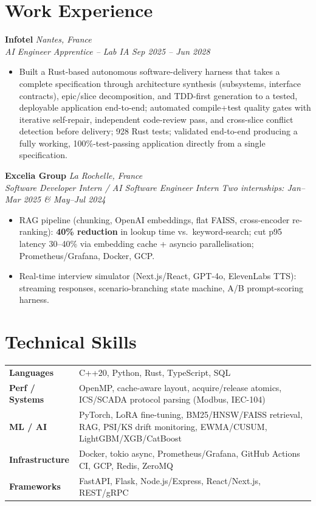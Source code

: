 \documentclass[10pt]{article}
\newcommand{\entry}[4]{%
  \noindent\textbf{#1} \hfill \textit{#2} \\
  \textit{#3} \hfill \textit{#4}\\[-0.22em]
}
\begin{document}
\section*{Work Experience}
\entry{Infotel}{Nantes, France}{AI Engineer Apprentice -- Lab IA}{Sep 2025 -- Jun 2028}
\begin{itemize}
  \item Built a Rust-based autonomous software-delivery harness that takes a complete specification through architecture synthesis (subsystems, interface contracts), epic/slice decomposition, and TDD-first generation to a tested, deployable application end-to-end; automated compile+test quality gates with iterative self-repair, independent code-review pass, and cross-slice conflict detection before delivery; 928 Rust tests; validated end-to-end producing a fully working, 100\%-test-passing application directly from a single specification.
\end{itemize}
\entry{Excelia Group}{La Rochelle, France}{Software Developer Intern / AI Software Engineer Intern}{Two internships: Jan--Mar 2025 \& May--Jul 2024}
\begin{itemize}
  \item RAG pipeline (chunking, OpenAI embeddings, flat FAISS, cross-encoder re-ranking): \textbf{40\% reduction} in lookup time vs.\ keyword-search; cut p95 latency 30--40\% via embedding cache + asyncio parallelisation; Prometheus/Grafana, Docker, GCP.
  \item Real-time interview simulator (Next.js/React, GPT-4o, ElevenLabs TTS): streaming responses, scenario-branching state machine, A/B prompt-scoring harness.
\end{itemize}

\section*{Technical Skills}
\noindent
\begin{tabular}{@{}p{2.7cm}p{15.5cm}@{}}
\textbf{Languages} & C++20, Python, Rust, TypeScript, SQL \\
\textbf{Perf / Systems} & OpenMP, cache-aware layout, acquire/release atomics, ICS/SCADA protocol parsing (Modbus, IEC-104) \\
\textbf{ML / AI} & PyTorch, LoRA fine-tuning, BM25/HNSW/FAISS retrieval, RAG, PSI/KS drift monitoring, EWMA/CUSUM, LightGBM/XGB/CatBoost \\
\textbf{Infrastructure} & Docker, tokio async, Prometheus/Grafana, GitHub Actions CI, GCP, Redis, ZeroMQ \\
\textbf{Frameworks} & FastAPI, Flask, Node.js/Express, React/Next.js, REST/gRPC \\
\end{tabular}
\end{document}
